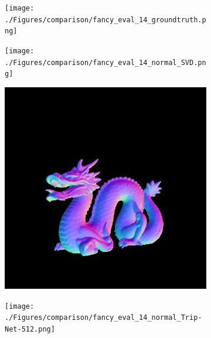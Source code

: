 \documentclass[border=15pt, multi, tikz]{article}
\begin{document}
\begin{figure}[H]
	\centering
	\begin{subfigure}[b]{0.24\linewidth}
		\texttt{[image: ./Figures/comparison/fancy\_eval\_14\_groundtruth.png]}
	\end{subfigure}
	\begin{subfigure}[b]{0.24\linewidth}
		\texttt{[image: ./Figures/comparison/fancy\_eval\_14\_normal\_SVD.png]}
	\end{subfigure}
	\begin{subfigure}[b]{0.24\linewidth}
		\includegraphics[width=\linewidth]{./Figures/comparison/fancy_eval_14_normal_GCNN-512-269.png}
	\end{subfigure}
	\begin{subfigure}[b]{0.24\linewidth}
		\texttt{[image: ./Figures/comparison/fancy\_eval\_14\_normal\_Trip-Net-512.png]}
	\end{subfigure}
	

\end{figure}
\end{document}

